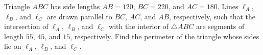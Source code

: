 Triangle $ABC$ has side lengths $AB=120$, $BC=220$, and $AC=180$. Lines $\ell_{A}$, $\ell_{B}$, and $\ell_{C}$ are drawn parallel to $\overline{BC}$, $\overline{AC}$, and $\overline{AB}$, respectively, such that the intersection of $\ell_{A}$, $\ell_{B}$, and $\ell_{C}$ with the interior of $\triangle ABC$ are segments of length $55$, $45$, and $15$, respectively. Find the perimeter of the triangle whose sides lie on $\ell_{A}$, $\ell_{B}$, and $\ell_{C}$.